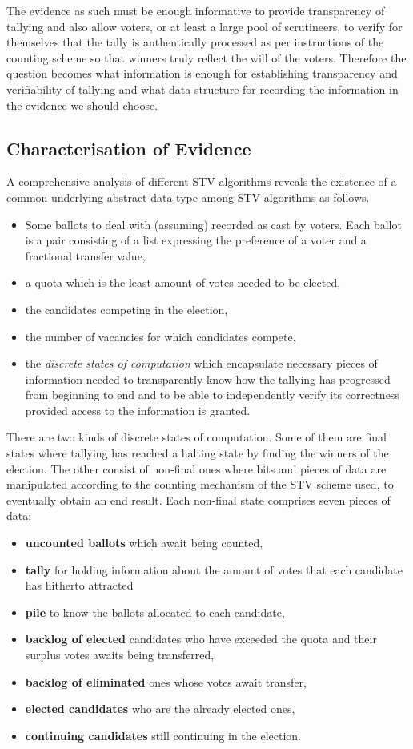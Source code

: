 \documentclass[10pt,conference]{IEEEtran}
\begin{document}
  
The evidence as such must be enough informative to provide transparency of tallying and also allow voters, or at least a large pool of scrutineers, to verify for themselves that the tally is authentically processed as per instructions of the counting scheme so that winners truly reflect the will of the voters. Therefore the question becomes what information is enough for establishing transparency and verifiability of tallying and what data structure for recording the information in the evidence we should choose.
\subsection{Characterisation of Evidence} 
A comprehensive analysis of different STV algorithms reveals the existence of a common underlying abstract data type among STV algorithms as follows. 
\begin{itemize}
\item Some ballots to deal with (assuming) recorded as cast by voters. Each ballot is a pair consisting of a list expressing the preference of a voter and a fractional transfer value,
\item a quota which is the least amount of votes needed to be elected, 
\item the candidates competing in the election, 
\item the number of vacancies for which candidates compete,
\item the \emph{discrete states of computation} which encapsulate necessary pieces of information needed to transparently know how the tallying has progressed from beginning to end and to be able to independently verify its correctness provided access to the information is granted. 
\end{itemize}
There are two kinds of discrete states of computation. Some of them are final states where tallying has reached a halting state by finding the winners of the election. The other consist of non-final ones where bits and pieces of data are manipulated according to the counting mechanism of the STV scheme used, to eventually obtain an end result. Each non-final state comprises seven pieces of data: 
\begin{itemize}
 \item\textbf{uncounted ballots} which await being counted,
 \item\textbf{tally} for holding information about the amount of votes that each candidate has hitherto attracted %
 \item\textbf{pile} to know the ballots allocated to each candidate, 
 \item\textbf{backlog of elected} candidates who have exceeded the quota and their surplus votes awaits being transferred,
 \item\textbf{backlog of eliminated} ones whose votes await transfer,
 \item\textbf{elected candidates} who are the already elected ones,%
 \item\textbf{continuing candidates} still continuing in the election. 
 \end{itemize}
\end{document}
